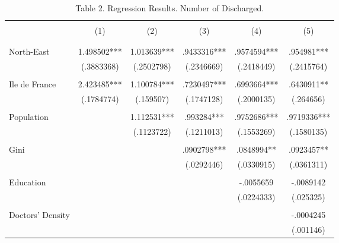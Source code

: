 \documentclass[a4paper]{article}
\theoremstyle{plain}
\theoremstyle{definition}
\begin{document}
\begin{table}[htbp]\centering
\def\sym#1{\ifmmode^{#1}\else\(^{#1}\)\fi}
\caption*{Table 2. Regression Results. Number of Discharged.\label{tab1}}
\begin{tabular}{l*{5}{c}}
\hline\hline
\\
                &\multicolumn{1}{c}{(1)}&\multicolumn{1}{c}{(2)}&\multicolumn{1}{c}{(3)}&\multicolumn{1}{c}{(4)}&\multicolumn{1}{c}{(5)}\\
                &\multicolumn{1}{c}{}&\multicolumn{1}{c}{}&\multicolumn{1}{c}{}&\multicolumn{1}{c}{}&\multicolumn{1}{c}{}\\
\hline
\\
North-East            &    1.498502***&    1.013639***&    .9433316***&    .9574594***&     .954981***\\
                &  (.3883368)   &  (.2502798)   &  (.2346669)   &  (.2418449)   &  (.2415764)   \\
                \\
Ile de France           &    2.423485***&    1.100784***&    .7230497***&    .6993664***&    .6430911** \\
                &  (.1784774)   &   (.159507)   &  (.1747128)   &  (.2000135)   &   (.264656)   \\
                \\
Population  &               &    1.112531***&     .993284***&    .9752686***&    .9719336***\\
                &               &  (.1123722)   &  (.1211013)   &  (.1553269)   &  (.1580135)   \\
                \\
Gini            &               &               &    .0902798***&    .0848994** &    .0923457** \\
                &               &               &  (.0292446)   &  (.0330915)   &  (.0361311)   \\
                \\
Education            &               &               &               &   -.0055659   &   -.0089142   \\
                &               &               &               &  (.0224333)   &   (.025325)   \\
                \\
Doctors' Density &               &               &               &               &   -.0004245   \\
                &               &               &               &               &   (.001146)   \\

\end{tabular}
\end{table}
\end{document}
